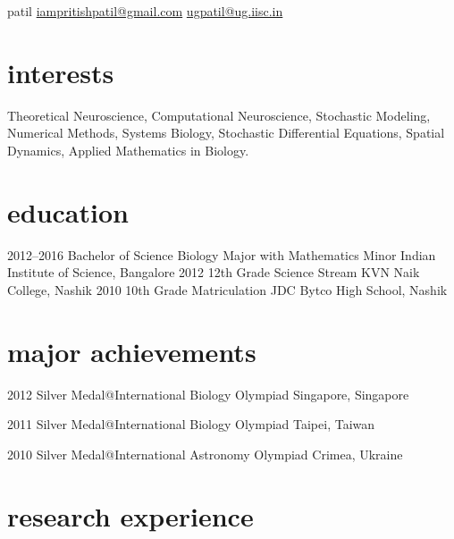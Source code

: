 \documentclass[11pt]{friggeri-cv}%
\begin{document}
 {patil} 
        {\href{mailto:iampritishpatil@gmail.com}{iampritishpatil@gmail.com}\quad  
    \href{mailto:ugpatil@ug.iisc.in}{ugpatil@ug.iisc.in}
}



\section{interests}

Theoretical Neuroscience, Computational Neuroscience, Stochastic Modeling, Numerical Methods, Systems Biology, Stochastic Differential Equations, Spatial Dynamics, Applied Mathematics in Biology.


\section{education}

\begin{entrylist}
  \entryyy
    {2012--2016}
    {Bachelor of Science {\normalfont Biology Major with Mathematics Minor }}
    {Indian Institute of Science, Bangalore}
  \entryyy
    {2012}
    {12th Grade {\normalfont Science Stream}}
  {KVN Naik College, Nashik}
  \entryyy
    {2010}
    {10th Grade     {\normalfont Matriculation}}
    {JDC Bytco High School, Nashik}
\end{entrylist}


\section{major achievements}
\begin{entrylist}
  \entryyy
    {2012}
    { {\normalfont Silver Medal@}International Biology Olympiad     }
    {Singapore, Singapore}
    
  \entryyy
    {2011}
    {  {\normalfont Silver Medal@}International Biology Olympiad}
    {Taipei, Taiwan}
    
  \entryyy
    {2010}
    { {\normalfont Silver Medal@}International Astronomy Olympiad }
    {Crimea, Ukraine}



\end{entrylist}

\section{research experience}
\end{document}
